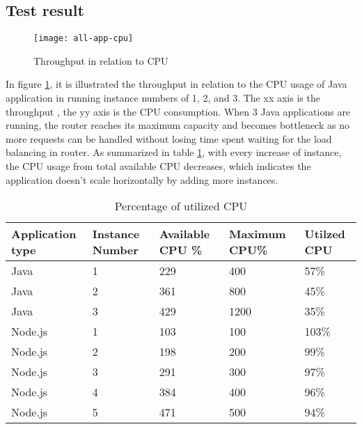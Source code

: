 \subsection{Test result}
 \begin{figure}[h]
	\centering
	\texttt{[image: all-app-cpu]}
	\caption{Throughput in relation to CPU}
	\label{all-app-cpu}
\end{figure}
In figure \ref{all-app-cpu}, it is illustrated the throughput in relation to the CPU usage of Java application in running instance numbers of 1, 2, and 3. The xx axis is the throughput , the yy axis is the CPU consumption. When 3 Java applications are running, the router reaches its maximum capacity and becomes bottleneck as no more requests can be handled without losing time spent waiting for the load balancing in router. As summarized in table \ref{app-cpu-usage}, with every increase of instance, the CPU usage from total available CPU decreases, which indicates the application doesn't scale horizontally by adding more instances. 
\begin{table}[h]
	\caption{Percentage of utilized CPU}
	\label{app-cpu-usage}
	\renewcommand{\arraystretch}{1.2}
	\centering
	\sffamily
	\begin{footnotesize}
		\begin{tabular}{l l l l l  }
			\toprule
			\textbf{Application  type} &\textbf{Instance Number} & \textbf{Available CPU \%} & \textbf{Maximum CPU\%}& \textbf{Utilzed CPU} }\\
		\midrule
		Java &1 	&	229	 & 400 & 57\% \\
		Java &2	&	361 & 800& 45\% \\
		Java &3	&	429  &	1200 & 35\%\\
				\midrule
			Node.js &1 	&	103	 & 100 & 103\% \\
		Node.js &2	&	198 &  200& 99\% \\
		Node.js &3	&	291 & 300 & 97\%\\
		Node.js &4	&	384 & 400 & 96\%\\
		Node.js &5	&	471 & 500 & 94\%\\
		\bottomrule
	\end{tabular}
\end{footnotesize}
\rmfamily
\end{table}

